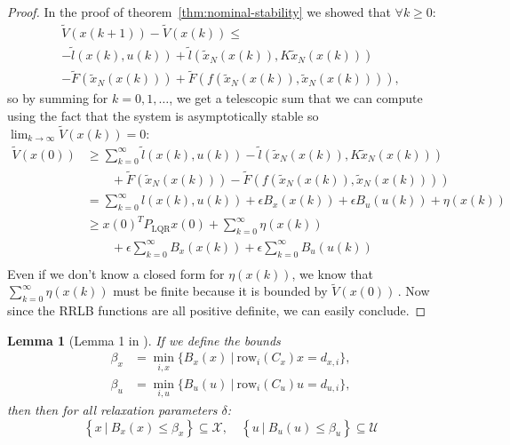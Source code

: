 \documentclass[conference]{IEEEtran}
\newtheorem{lemma}[theorem]{Lemma}
\theoremstyle{definition}
\theoremstyle{remark}
\def\cal#1{\mathcal{#1}}
\def\rm#1{\mathrm{#1}}
\begin{document}
\begin{proof}
	In the proof of theorem~\ref{thm:nominal-stability} we showed that $\forall k\geq 0$:
	\begin{multline*}
		\tilde{V}(x(k+1))-\tilde{V}(x(k))\leq\\
		-\tilde{l}(x(k),u(k))+\tilde{l}(\tilde{x}_N(x(k)), K\tilde{x}_N(x(k)))\\
		-\tilde{F}(\tilde{x}_N(x(k)))+\tilde{F}(f(\tilde{x}_N(x(k)),\tilde{x}_N(x(k)))),
	\end{multline*}
	so by summing for $k=0,1,\dots$, we get a telescopic sum that we can compute using the fact that the system is asymptotically stable so $\lim_{k\to\infty}\tilde{V}(x(k))=0$:
	\begin{align*}
		\tilde{V}(x(0))&\geq\sum_{k=0}^\infty\tilde{l}(x(k),u(k))-\tilde{l}(\tilde{x}_N(x(k)), K\tilde{x}_N(x(k)))\\
		&\qquad+\tilde{F}(\tilde{x}_N(x(k)))-\tilde{F}(f(\tilde{x}_N(x(k)),\tilde{x}_N(x(k))))\\
		&=\sum_{k=0}^\infty l(x(k), u(k))+\epsilon B_x(x(k))+\epsilon B_u(u(k))+\eta(x(k))\\
		&\geq x(0)^TP_{\rm{LQR}}x(0)+\sum_{k=0}^\infty\eta(x(k))\\
		&\qquad+\epsilon\sum_{k=0}^\infty B_x(x(k))+\epsilon\sum_{k=0}^\infty B_u(u(k))\\
	\end{align*}
	Even if we don't know a closed form for $\eta(x(k))$, we know that $\sum_{k=0}^\infty\eta(x(k))$ must be finite because it is bounded by $\tilde{V}(x(0))$\,.
	Now since the RRLB functions are all positive definite, we can easily conclude.
\end{proof}


\begin{lemma}[Lemma 1 in \cite{RRLB-linear-MPC}]
	\label{thm:constraint-set-def-with-RRLB}
	If we define the bounds 
	\begin{align*}
		\beta_x&=\underset{i,x}{\min}\{B_x(x)~|~\rm{row}_i(C_x)x=d_{x,i}\},\\
		\beta_u&=\underset{i,u}{\min}\{B_u(u)~|~\rm{row}_i(C_u)u=d_{u,i}\},
	\end{align*}
	then then for all relaxation parameters $\delta$:
	\begin{equation}
		\left\{x~|~B_x(x)\leq\beta_x\right\}\subseteq\cal{X},\quad\left\{u~|~B_u(u)\leq\beta_u\right\}\subseteq\cal{U}
	\end{equation}
\end{lemma}
\end{document}
